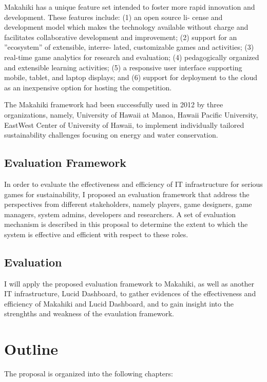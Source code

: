 Makahiki has a unique feature set intended
to foster more rapid innovation and development. These features include: (1) an open source li-
cense and development model which makes the technology available without charge and facilitates
collaborative development and improvement; (2) support for an ”ecosystem” of extensible, interre-
lated, customizable games and activities; (3) real-time game analytics for research
and evaluation; (4) pedagogically organized and extensible learning activities; (5) a responsive user
interface supporting mobile, tablet, and laptop displays; and (6) support for deployment to the
cloud as an inexpensive option for hosting the competition.

The Makahiki framework had been successfully used in 2012 by three organizations, namely, University of
Hawaii at Manoa, Hawaii Pacific University, EastWest Center of University of Hawaii, to implement
individually tailored sustainability challenges focusing on energy and water conservation.

\subsection{Evaluation Framework}
In order to evaluate the effectiveness and efficiency of IT infrastructure for serious games for sustainability, I proposed an evaluation framework that address the perspectives from different stakeholders, namely players, game designers, game managers, system admins, developers and researchers. A set of evaluation mechanism is described in this proposal to determine the extent to which the system is effective and efficient with respect to these roles.

\subsection{Evaluation}
I will apply the proposed evaluation framework to Makahiki, as well as another IT infrastructure, Lucid Dashboard, to gather evidences of the effectiveness and efficiency of Makahiki and Lucid Dashboard, and to gain insight into the strenghths and weakness of the evaulation framework.

\section{Outline}

The proposal is organized into the following chapters:

